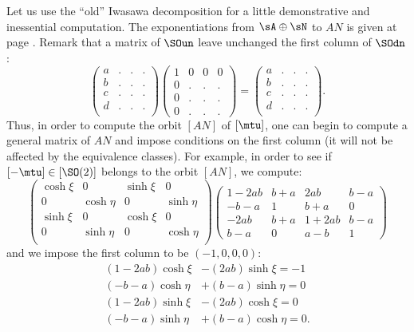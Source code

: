 Let us use the ``old''{} Iwasawa decomposition for a little demonstrative and inessential computation. The exponentiations from $\sA\oplus\sN$ to $AN$ is given at page \pageref{pg:exp_AN}. Remark that a matrix of $\SOun$ leave unchanged the first column of $\SOdn$:
\[
\begin{pmatrix}
  a&.&.&.\\
  b&.&.&.\\
  c&.&.&.\\
  d&.&.&.\\
\end{pmatrix}
\begin{pmatrix}
 1&0&0&0\\
 0&.&.&.\\
 0&.&.&.\\
 0&.&.&.
\end{pmatrix}=
\begin{pmatrix}
  a&.&.&.\\
  b&.&.&.\\
  c&.&.&.\\
  d&.&.&.\\
\end{pmatrix}.
\]
Thus, in order to compute the orbit $[AN]$ of $[\mtu]$, one can begin to compute a general matrix of $AN$ and impose conditions on the first column (it will not be affected by the equivalence classes). For example, in order to see if $[-\mtu]\in [\SO(2)]$ belongs to the orbit $[AN]$, we compute:\label{PgExplAN}
\begin{equation}\label{eq:gene_R}
   \begin{pmatrix}
  \cosh\xi &    0      & \sinh\xi &    0  \\
    0       & \cosh\eta &    0      & \sinh\eta \\
  \sinh\xi &    0      & \cosh\xi &    0     \\
    0       & \sinh\eta &    0      & \cosh\eta \\
     \end{pmatrix}
     \begin{pmatrix}
                 1-2ab & b+a & 2ab   & b-a \\
 		 -b-a  & 1   & b+a   &  0   \\
		 -2ab  & b+a & 1+2ab &  b-a \\
		  b-a  &  0  &  a-b  &  1
	      \end{pmatrix}
\end{equation}
and we impose the first column to be $( -1,0,0,0)$:
\begin{subequations}\label{eq:S_14}
\begin{align}
  (1-2ab)\cosh\xi&-(2ab)\sinh\xi=-1   \label{eq:S1}\\
  (-b-a)\cosh\eta&+(b-a)\sinh\eta=0    \label{eq:S2}\\
  (1-2ab)\sinh\xi&-(2ab)\cosh\xi=0     \label{eq:S3}\\
  (-b-a)\sinh\eta&+(b-a)\cosh\eta=0.  \label{eq:S4}
\end{align}
\end{subequations}

